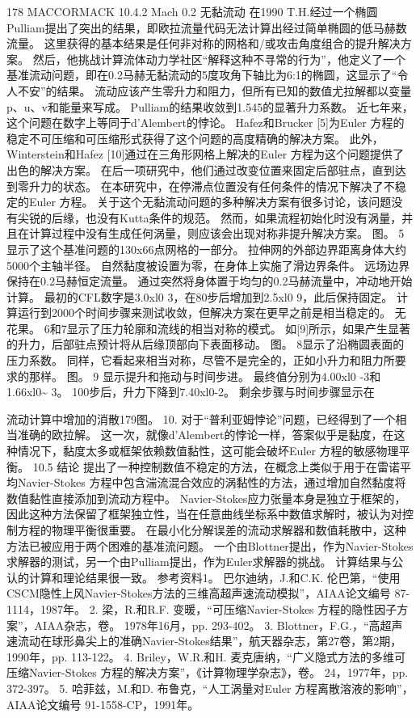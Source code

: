 \documentclass[UTF8,11pt,a4paper,openany,fontset=fandol]{ctexbook}
\begin{document}
178 MACCORMACK 10.4.2 Mach 0.2 无黏流动 在1990 T.H.经过一个椭圆 Pulliam提出了突出的结果，即欧拉流量代码无法计算出经过简单椭圆的低马赫数流量。 这里获得的基本结果是任何非对称的网格和/或攻击角度组合的提升解决方案。 然后，他挑战计算流体动力学社区“解释这种不寻常的行为”，他定义了一个基准流动问题，即在0.2马赫无黏流动的5度攻角下轴比为6:1的椭圆，这显示了“令人不安”的结果。 流动应该产生零升力和阻力，但所有已知的数值尤拉解都以变量p、u、v和能量来写成。 Pulliam的结果收敛到1.545的显著升力系数。 近七年来，这个问题在数字上等同于d'Alembert的悖论。 Hafez和Brucker [5]为Euler 方程的稳定不可压缩和可压缩形式获得了这个问题的高度精确的解决方案。 此外，Winterstein和Hafez [10]通过在三角形网格上解决的Euler 方程为这个问题提供了出色的解决方案。 在后一项研究中，他们通过改变位置来固定后部驻点，直到达到零升力的状态。 在本研究中，在停滞点位置没有任何条件的情况下解决了不稳定的Euler 方程。 关于这个无黏流动问题的多种解决方案有很多讨论，该问题没有尖锐的后缘，也没有Kutta条件的规范。 然而，如果流程初始化时没有涡量，并且在计算过程中没有生成任何涡量，则应该会出现对称非提升解决方案。 图。 5显示了这个基准问题的130x66点网格的一部分。 拉伸网的外部边界距离身体大约5000个主轴半径。 自然黏度被设置为零，在身体上实施了滑边界条件。 远场边界保持在0.2马赫恒定流量。 通过突然将身体置于均匀的0.2马赫流量中，冲动地开始计算。 最初的CFL数字是3.0xl0 3，在80步后增加到2.5xl0 9，此后保持固定。 计算运行到2000个时间步骤来测试收敛，但解决方案在更早之前是相当稳定的。 无花果。 6和7显示了压力轮廓和流线的相当对称的模式。 如[9]所示，如果产生显著的升力，后部驻点预计将从后缘顶部向下表面移动。 图。 8显示了沿椭圆表面的压力系数。 同样，它看起来相当对称，尽管不是完全的，正如小升力和阻力所要求的那样。 图。 9 显示提升和拖动与时间步进。 最终值分别为4.00xl0 -3和1.66xl0\textasciitilde{} 3。 100步后，升力下降到7.40xl0-2。 剩余步骤与时间步骤显示在

流动计算中增加的消散179图。 10. 对于“普利亚姆悖论”问题，已经得到了一个相当准确的欧拉解。 这一次，就像d'Alembert的悖论一样，答案似乎是黏度，在这种情况下，黏度太多或框架依赖数值黏性，这可能会破坏Euler 方程的敏感物理平衡。 10.5 结论 提出了一种控制数值不稳定的方法，在概念上类似于用于在雷诺平均Navier-Stokes 方程中包含湍流混合效应的涡黏性的方法，通过增加自然黏度将数值黏性直接添加到流动方程中。 Navier-Stokes应力张量本身是独立于框架的，因此这种方法保留了框架独立性，当在任意曲线坐标系中数值求解时，被认为对控制方程的物理平衡很重要。 在最小化分解误差的流动求解器和数值耗散中，这种方法已被应用于两个困难的基准流问题。 一个由Blottner提出，作为Navier-Stokes求解器的测试，另一个由Pulliam提出，作为Euler求解器的挑战。 计算结果与公认的计算和理论结果很一致。 参考资料1。 巴尔迪纳，J.和C.K. 伦巴第，“使用CSCM隐性上风Navier-Stokes方法的三维高超声速流动模拟”，AIAA论文编号 87-1114，1987年。 2. 梁，R.和R.F. 变暖，“可压缩Navier-Stokes 方程的隐性因子方案”，AIAA杂志，卷。 1978年16月，pp. 293-402。 3. Blottner，F.G.，“高超声速流动在球形鼻尖上的准确Navier-Stokes结果”，航天器杂志，第27卷，第2期，1990年，pp. 113-122。 4. Briley，W.R.和H. 麦克唐纳，“广义隐式方法的多维可压缩Navier-Stokes 方程的解决方案”，《计算物理学杂志》，卷。 24，1977年，pp. 372-397。 5. 哈菲兹，M.和D. 布鲁克，“人工涡量对Euler 方程离散溶液的影响”，AIAA论文编号 91-1558-CP，1991年。
\end{document}
